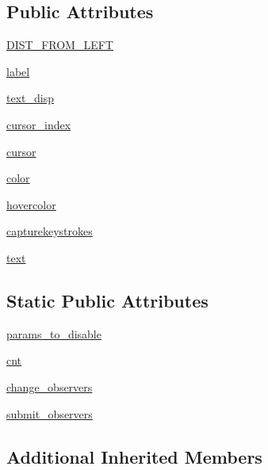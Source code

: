 \subsection*{Public Attributes}
\begin{DoxyCompactItemize}
\item 
\hyperlink{classmatplotlib_1_1widgets_1_1TextBox_afd70b04988e876a78ee5a0b490e36256}{D\+I\+S\+T\+\_\+\+F\+R\+O\+M\+\_\+\+L\+E\+FT}
\item 
\hyperlink{classmatplotlib_1_1widgets_1_1TextBox_aa53ee24464cfcdcd484a6f83bf7ed41f}{label}
\item 
\hyperlink{classmatplotlib_1_1widgets_1_1TextBox_a75098227ce143f5a63fb6d1503e913c6}{text\+\_\+disp}
\item 
\hyperlink{classmatplotlib_1_1widgets_1_1TextBox_ab23a9d42a4346220d4f455d870f879dc}{cursor\+\_\+index}
\item 
\hyperlink{classmatplotlib_1_1widgets_1_1TextBox_acf034e1350085ecee10a9c5055fe6330}{cursor}
\item 
\hyperlink{classmatplotlib_1_1widgets_1_1TextBox_acfeec0fa796162b15e0b91597a3c019a}{color}
\item 
\hyperlink{classmatplotlib_1_1widgets_1_1TextBox_ab58efe36eb3c8bf787a87f6c133bdceb}{hovercolor}
\item 
\hyperlink{classmatplotlib_1_1widgets_1_1TextBox_a2b4f2efaec33501f8e736437689a253a}{capturekeystrokes}
\item 
\hyperlink{classmatplotlib_1_1widgets_1_1TextBox_afd4d918f6ea5f0a6beeb4f3eeb9f7b13}{text}
\end{DoxyCompactItemize}
\subsection*{Static Public Attributes}
\begin{DoxyCompactItemize}
\item 
\hyperlink{classmatplotlib_1_1widgets_1_1TextBox_a6e041b6c3d58375826cb2050f3d57ab2}{params\+\_\+to\+\_\+disable}
\item 
\hyperlink{classmatplotlib_1_1widgets_1_1TextBox_a548a0ed5e4de7d8ac1ca0741d44024c8}{cnt}
\item 
\hyperlink{classmatplotlib_1_1widgets_1_1TextBox_a92dc9da8e55505a028d06e561d9e848e}{change\+\_\+observers}
\item 
\hyperlink{classmatplotlib_1_1widgets_1_1TextBox_a6134130ea862b7f294dbfc53da73f215}{submit\+\_\+observers}
\end{DoxyCompactItemize}
\subsection*{Additional Inherited Members}


